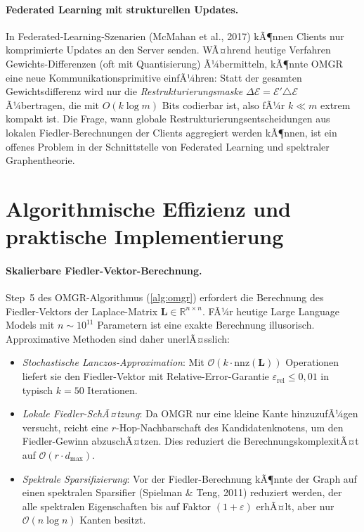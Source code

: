 ﻿\documentclass[12pt, a4paper, openany]{report}
\newcommand{\R}{\mathbb{R}}
\newcommand{\calE}{\mathcal{E}}
\newcommand{\eps}{\varepsilon}
\begin{document}
\paragraph{Federated Learning mit strukturellen Updates.}
In Federated-Learning-Szenarien (McMahan et al., 2017) kÃ¶nnen Clients
nur komprimierte Updates an den Server senden.  WÃ¤hrend heutige Verfahren
Gewichts-Differenzen (oft mit Quantisierung) Ã¼bermitteln, kÃ¶nnte
OMGR eine neue Kommunikationsprimitive einfÃ¼hren: Statt der gesamten
Gewichtsdifferenz wird nur die \emph{Restrukturierungsmaske}
$\Delta\calE = \calE' \triangle \calE$ Ã¼bertragen, die mit $O(k \log m)$
Bits codierbar ist, also fÃ¼r $k \ll m$ extrem kompakt ist.
Die Frage, wann globale Restrukturierungsentscheidungen aus lokalen
Fiedler-Berechnungen der Clients aggregiert werden kÃ¶nnen, ist ein
offenes Problem in der Schnittstelle von Federated Learning und
spektraler Graphentheorie.

\section{Algorithmische Effizienz und praktische Implementierung}
\label{sec:outlook_algo}

\paragraph{Skalierbare Fiedler-Vektor-Berechnung.}
Step~5 des OMGR-Algorithmus (\cref{alg:omgr}) erfordert die Berechnung
des Fiedler-Vektors der Laplace-Matrix $\bm{L} \in \R^{n \times n}$.
FÃ¼r heutige Large Language Models mit $n \sim 10^{11}$ Parametern ist
eine exakte Berechnung illusorisch.  Approximative Methoden sind
daher unerlÃ¤sslich:
\begin{itemize}
  \item \emph{Stochastische Lanczos-Approximation}: Mit $\mathcal{O}(k \cdot \mathrm{nnz}(\bm{L}))$
    Operationen liefert sie den Fiedler-Vektor mit Relative-Error-Garantie
    $\eps_{\mathrm{rel}} \leq 0{,}01$ in typisch $k = 50$ Iterationen.
  \item \emph{Lokale Fiedler-SchÃ¤tzung}: Da OMGR nur eine kleine Kante
    hinzuzufÃ¼gen versucht, reicht eine $r$-Hop-Nachbarschaft des
    Kandidatenknotens, um den Fiedler-Gewinn abzuschÃ¤tzen.  Dies reduziert
    die BerechnungskomplexitÃ¤t auf $\mathcal{O}(r \cdot d_{\max})$.
  \item \emph{Spektrale Sparsifizierung}: Vor der Fiedler-Berechnung
    kÃ¶nnte der Graph auf einen spektralen Sparsifier (Spielman \& Teng, 2011)
    reduziert werden, der alle spektralen Eigenschaften bis auf Faktor
    $(1+\eps)$ erhÃ¤lt, aber nur $\mathcal{O}(n \log n)$ Kanten besitzt.
\end{itemize}
\end{document}
